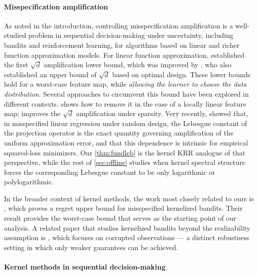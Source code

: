\documentclass{article}
\let\cite\citep
\numberwithin{theorem}{section}
\theoremstyle{definition}
\begin{document}
\paragraph{Misspecification amplification}
As noted in the introduction, controlling misspecification amplification is a well-studied problem in sequential decision-making under uncertainty, including bandits and reinforcement learning, for algorithms based on linear and richer function approximation models.
For linear function approximation, \cite{du2020good} established the first
$\sqrt d$ amplification lower bound, which was improved by \cite{lattimore2020learning}, who also established an upper bound of $\sqrt d$
based on optimal design. These lower bounds hold for a worst-case feature map, while \textit{allowing the learner to choose the data distribution}. Several approaches to circumvent this bound have been explored in different contexts. \cite{maran2024local} shows how to remove it in the case of a locally linear feature map; \cite{dong2023does} improves the $\sqrt d$ amplification under sparsity. Very recently, \cite{maran2025beyond} showed that, in misspecified linear regression under random design, the Lebesgue constant of the projection operator is the exact quantity governing amplification of the uniform approximation error, and that this dependence is intrinsic for empirical squared-loss minimizers. Our \cref{thm:fundleb} is the kernel KRR analogue of that perspective, while the rest of \cref{sec:offline} studies when kernel spectral structure forces the corresponding Lebesgue constant to be only logarithmic or polylogarithmic. 

In the broader context of kernel methods, the work most closely related to ours is \cite{bogunovic2021misspecified}, which proves a regret upper bound for misspecified kernelized bandits. Their result provides the worst-case bound that serves as the starting point of our analysis. A related paper that studies kernelized bandits beyond the realizability assumption is
\cite{ezzerg2025robust}, which focuses on corrupted observations — a distinct robustness setting in which only weaker guarantees can be achieved.

\paragraph{Kernel methods in sequential decision-making}
\end{document}
